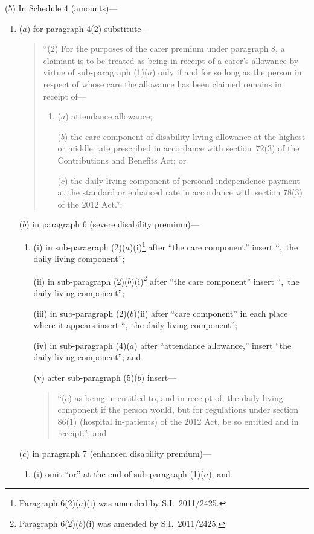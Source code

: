 \documentclass[12pt,a4paper]{article}
\begin{document}
(5) In Schedule 4 (amounts)—
\begin{enumerate}\item[]
($a$) for paragraph 4(2) substitute—
\begin{quotation}
“(2) For the purposes of the carer premium under paragraph 8, a claimant is to be treated as being in receipt of a carer’s allowance by virtue of sub-paragraph (1)($a$)  only if and for so long as the person in respect of whose care the allowance has been claimed remains in receipt of—
\begin{enumerate}\item[]
($a$) attendance allowance;

($b$) the care component of disability living allowance at the highest or middle rate prescribed in accordance with section~72(3) of the Contributions and Benefits Act; or

($c$) the daily living component of personal independence payment at the standard or enhanced rate in accordance with section 78(3) of the 2012 Act.”;
\end{enumerate}
\end{quotation}

($b$) in paragraph 6 (severe disability premium)—
\begin{enumerate}\item[]
(i) in sub-paragraph (2)($a$)(i)\footnote{Paragraph 6(2)($a$)(i)  was amended by S.I.~2011/2425.} after “the care component” insert “,~the daily living component”;

(ii) in sub-paragraph (2)($b$)(i)\footnote{Paragraph 6(2)($b$)(i)  was amended by S.I.~2011/2425.} after “the care component” insert “,~the daily living component”;

(iii) in sub-paragraph (2)($b$)(ii)  after “care component” in each place where it appears insert “,~the daily living component”;

(iv) in sub-paragraph (4)($a$)  after “attendance allowance,” insert “the daily living component”; and

(v) after sub-paragraph (5)($b$)  insert—
\begin{quotation}
“($c$) as being in entitled to, and in receipt of, the daily living component if the person would, but for regulations under section 86(1) (hospital in-patients) of the 2012 Act, be so entitled and in receipt.”; and
\end{quotation}
\end{enumerate}

($c$) in paragraph 7 (enhanced disability premium)—
\begin{enumerate}\item[]
(i) omit “or” at the end of sub-paragraph (1)($a$); and


\end{enumerate}
\end{enumerate}
\end{document}
